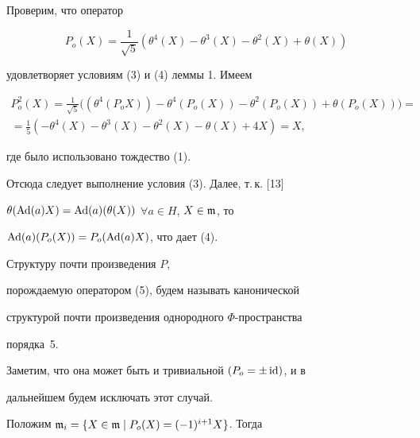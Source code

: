 \begin{pf}


Проверим, что оператор


\begin{equation}\label{5}


P_o(X)= \frac{1}{\sqrt{5}}(\theta^4(X)-\theta^3(X)-\theta^2(X)+\theta(X))


\end{equation}


удовлетворяет условиям (3) и (4) леммы 1. Имеем


\begin{multline*}


P_o^2(X)=\frac{1}{\sqrt{5}}\big((\theta^4(P_oX))- \theta^4(P_o(X))-


\theta^2(P_o(X))+\theta(P_o(X))\big)= \\


=\frac{1}{5}(-\theta^4(X)-\theta^3(X)-\theta^2(X)-\theta(X)+4X)=X,


\end{multline*}


где было использовано тождество (1).


Отсюда следует выполнение условия (3). Далее, т.\,к. [13]


$\theta(\operatorname{Ad}(a)X)=\operatorname{Ad}(a)(\theta(X))$ $\forall a \in H$, $X \in \frak{m}$, то


$\operatorname{Ad}(a)(P_o(X))=P_o(\operatorname{Ad}(a)X)$, что дает (4).


\end{pf}





\begin{defn}


Структуру почти произведения $P$,


порождаемую оператором (5), будем называть канонической


структурой почти произведения однородного $\Phi$-пространства


порядка~5.


\end{defn}





Заметим, что она может быть и тривиальной $(P_o=\pm \operatorname{id})$, и в


дальнейшем будем исключать этот случай.





Положим $\frak{m}_i=\{X \in \frak{m}\mid P_o(X)=(-1)^{i+1}X \}$. Тогда


